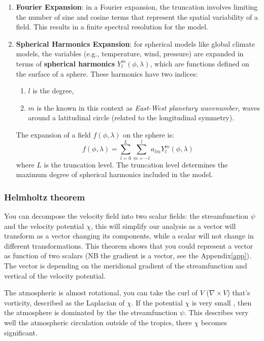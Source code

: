 \begin{enumerate}
    \item \textbf{Fourier Expansion}: in a Fourier expansion, the truncation involves limiting the number of sine and cosine terms that represent the spatial variability of a field. This results in a finite spectral resolution for the model.
    \item \textbf{Spherical Harmonics Expansion}: for spherical models like global climate models, the variables (e.g., temperature, wind, pressure) are expanded in terms of \textbf{spherical harmonics} $Y_l^m(\phi,\lambda)$, which are functions defined on the surface of a sphere. These harmonics have two indices:
        \begin{enumerate}
            \item  $l$ is the degree,
            \item $m$ is the known in this context as \textit{East-West planetary wavenumber}, waves around a latitudinal circle (related to the longitudinal symmetry).
        \end{enumerate}
        The expansion of a field $f(\phi, \lambda)$ on the sphere is: $$f(\phi, \lambda)=\displaystyle\sum_{l=0}^L\displaystyle\sum_{m=-l}^la_{lm}Y_l^m(\phi,\lambda)$$
        where $L$ is the truncation level. The truncation level determines the maximum degree of spherical harmonics included in the model.
\end{enumerate}

\subsubsection{Helmholtz theorem}
You can decompose the velocity field into two scalar fields: the streamfunction $\psi$ and the velocity potential $\chi$, this will simplify our analysis as a  vector will transform as a vector changing its components, while a scalar will not change in different transformations. This theorem shows that you could represent a vector as function of two scalars (NB the gradient is a vector, see the Appendix\ref{app}). The vector is depending on the meridional gradient of the streamfunction and vertical of the velocity potential.


The atmospheric is almost rotational, you can take the curl of $V$ ($\nabla \times V$) that's vorticity, described as the Laplacian of $\chi$. If the potential $\chi$ is very small , then the atmosphere is dominated by the the streamfunction $\psi$. This describes very well the atmospheric circulation outside of the tropics, there $\chi$ becomes significant. 
